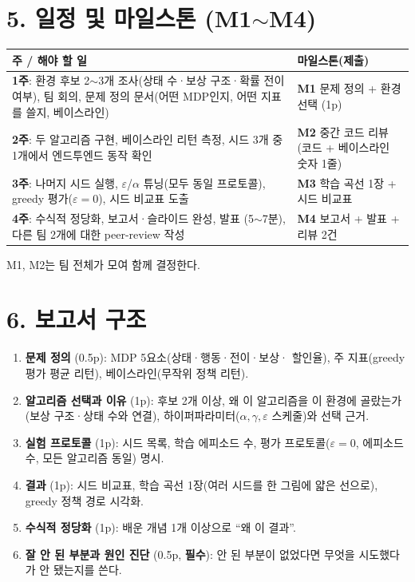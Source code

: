 \documentclass[12pt]{article}
\begin{document}
\section*{5. 일정 및 마일스톤 (M1$\sim$M4)}
\begin{center}
\small
\begin{tabular}{@{}p{7.4cm}p{5.4cm}@{}}
\toprule
\textbf{주 / 해야 할 일} & \textbf{마일스톤(제출)} \\
\midrule
\textbf{1주}: 환경 후보 2$\sim$3개 조사(상태 수·보상 구조·확률
전이 여부), 팀 회의, 문제 정의 문서(어떤 MDP인지, 어떤 지표를
쓸지, 베이스라인) & \textbf{M1} 문제 정의 + 환경 선택 (1p) \\
\textbf{2주}: 두 알고리즘 구현, 베이스라인 리턴 측정, 시드 3개
중 1개에서 엔드투엔드 동작 확인 & \textbf{M2} 중간 코드 리뷰
(코드 + 베이스라인 숫자 1줄) \\
\textbf{3주}: 나머지 시드 실행, $\varepsilon$/$\alpha$ 튜닝(모두
동일 프로토콜), greedy 평가($\varepsilon=0$), 시드 비교표 도출 &
\textbf{M3} 학습 곡선 1장 + 시드 비교표 \\
\textbf{4주}: 수식적 정당화, 보고서·슬라이드 완성, 발표
(5$\sim$7분), 다른 팀 2개에 대한 peer-review 작성 & \textbf{M4}
보고서 + 발표 + 리뷰 2건 \\
\bottomrule
\end{tabular}
\end{center}
\vspace{4pt}
M1, M2는 팀 전체가 모여 함께 결정한다.

\section*{6. 보고서 구조}
\begin{enumerate}
\item \textbf{문제 정의} (0.5p): MDP 5요소(상태·행동·전이·보상·
  할인율), 주 지표(greedy 평가 평균 리턴), 베이스라인(무작위
  정책 리턴).
\item \textbf{알고리즘 선택과 이유} (1p): 후보 2개 이상, 왜 이
  알고리즘을 이 환경에 골랐는가(보상 구조·상태 수와 연결),
  하이퍼파라미터($\alpha,\gamma,\varepsilon$ 스케줄)와 선택 근거.
\item \textbf{실험 프로토콜} (1p): 시드 목록, 학습 에피소드 수,
  평가 프로토콜($\varepsilon=0$, 에피소드 수, 모든 알고리즘 동일)
  명시.
\item \textbf{결과} (1p): 시드 비교표, 학습 곡선 1장(여러 시드를
  한 그림에 얇은 선으로), greedy 정책 경로 시각화.
\item \textbf{수식적 정당화} (1p): 배운 개념 1개 이상으로 ``왜
  이 결과''.
\item \textbf{잘 안 된 부분과 원인 진단} (0.5p, \textbf{필수}):
  안 된 부분이 없었다면 무엇을 시도했다가 안 됐는지를 쓴다.
\end{enumerate}
\end{document}
